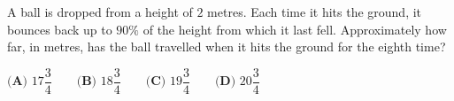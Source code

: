 A ball is dropped from a height of $2$ metres. Each time it hits the ground, it bounces back up to $90\%$ of the height from which it last fell. Approximately how far, in metres, has the ball travelled when it hits the ground for the eighth time?

$\textbf{(A) }17\dfrac34\qquad\textbf{(B) }18\dfrac34\qquad\textbf{(C) }19\dfrac34\qquad\textbf{(D) }20\dfrac34$
